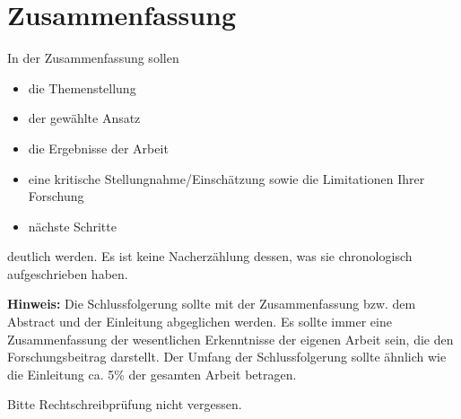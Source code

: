 
\section{Zusammenfassung} \label{zusammenfassung}

In der Zusammenfassung sollen
\begin{itemize}
\item die Themenstellung
\item der gewählte Ansatz
\item die Ergebnisse der Arbeit
\item eine kritische Stellungnahme/Einschätzung sowie die Limitationen Ihrer Forschung
\item nächste Schritte
\end{itemize}
deutlich werden.
Es ist keine Nacherzählung dessen, was sie chronologisch aufgeschrieben haben.

\textbf{Hinweis:}
Die Schlussfolgerung sollte mit der Zusammenfassung bzw. dem Abstract und der Einleitung abgeglichen werden. Es sollte immer eine Zusammenfassung der wesentlichen Erkenntnisse der eigenen Arbeit sein, die den Forschungsbeitrag darstellt. Der Umfang der Schlussfolgerung sollte ähnlich wie die Einleitung ca. 5\% der gesamten Arbeit betragen.


Bitte Rechtschreibprüfung nicht vergessen.
